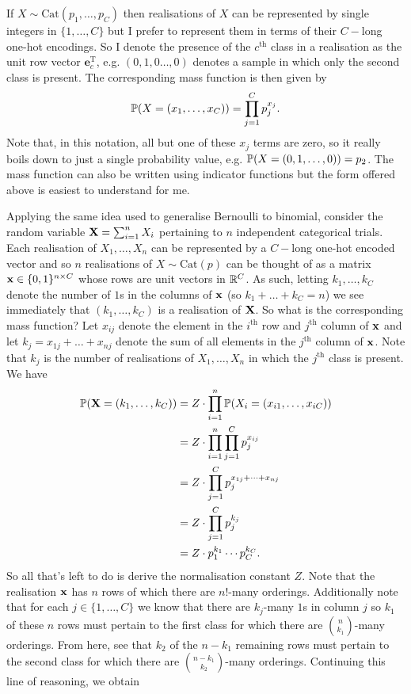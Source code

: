 \documentclass[11pt]{article}
\begin{document}
\begin{appendices}
If $X\sim\text{Cat}(p_1,\dots,p_C)$ then realisations of $X$ can be represented by single integers in $\{1,\dots,C\}$ but I prefer to represent them in terms of their $C-$long one-hot encodings. So I denote the presence of the $c^{\text{th}}$ class in a realisation as the unit row vector $\mathbf{e}_c^{\text{T}}$, e.g. $(0,1,0\dots,0)$ denotes a sample in which only the second class is present. The corresponding mass function is then given by
$$
\P(X=(x_1,\dots,x_C))
=
\prod_{j=1}^Cp_j^{x_j}.
$$
Note that, in this notation, all but one of these $x_j$ terms are zero, so it really boils down to just a single probability value, e.g. $\P(X=(0,1,\dots,0))=p_2$. The mass function can also be written using indicator functions but the form offered above is easiest to understand for me.

Applying the same idea used to generalise Bernoulli to binomial, consider the random variable $\X=\sum_{i=1}^nX_i$ pertaining to $n$ independent categorical trials. Each realisation of $X_1,\dots,X_n$ can be represented by a $C-$long one-hot encoded vector and so $n$ realisations of $X\sim\text{Cat}(p)$ can be thought of as a matrix $\x\in\{0,1\}^{n\times C}$ whose rows are unit vectors in $\R^C$. As such, letting $k_1,\dots,k_C$ denote the number of $1$s in the columns of $\x$ (so $k_1+\dots+k_C=n$) we see immediately that $(k_1,\dots,k_C)$ is a realisation of $\X$. So what is the corresponding mass function? Let $x_{ij}$ denote the element in the $i^{\text{th}}$ row and $j^{\text{th}}$ column of $\x$ and let $k_j=x_{1j}+\dots+x_{nj}$ denote the sum of all elements in the $j^{\text{th}}$ column of $\x$. Note that $k_j$ is the number of realisations of $X_1,\dots,X_n$ in which the $j^{\text{th}}$ class is present. We have
\begin{align*}
    \P(\X=(k_1,\dots,k_C))
    &=
    Z\cdot\prod_{i=1}^n\P(X_i=(x_{i1},\dots,x_{iC}))\\
    &=
    Z\cdot\prod_{i=1}^n\prod_{j=1}^Cp_j^{x_{ij}}\\
    &=
    Z\cdot\prod_{j=1}^Cp_j^{x_{1j}+\dots+x_{nj}}\\
    &=
    Z\cdot\prod_{j=1}^Cp_j^{k_j}\\
    &=
    Z\cdot p_1^{k_1}\cdots p_C^{k_C}.
\end{align*}
So all that's left to do is derive the normalisation constant $Z$. Note that the realisation $\x$ has $n$ rows of which there are $n!$-many orderings. Additionally note that for each $j\in\{1,\dots,C\}$ we know that there are $k_j$-many $1$s in column $j$ so $k_1$ of these $n$ rows must pertain to the first class for which there are $\binom{n}{k_1}$-many orderings. From here, see that $k_2$ of the $n-k_1$ remaining rows must pertain to the second class for which there are $\binom{n-k_1}{k_2}$-many orderings. Continuing this line of reasoning, we obtain

\end{appendices}
\end{document}

